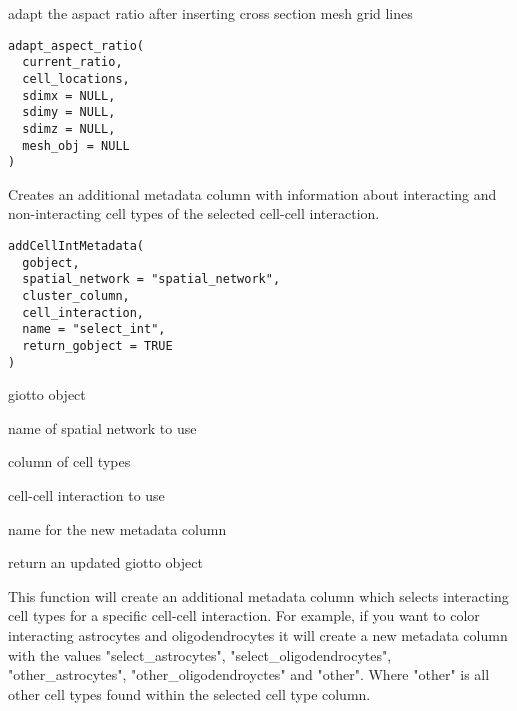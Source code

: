\documentclass[a4paper]{book}
\begin{document}
%
\begin{Description}\relax
adapt the aspact ratio after inserting cross section mesh grid lines
\end{Description}
%
\begin{Usage}
\begin{verbatim}
adapt_aspect_ratio(
  current_ratio,
  cell_locations,
  sdimx = NULL,
  sdimy = NULL,
  sdimz = NULL,
  mesh_obj = NULL
)
\end{verbatim}
\end{Usage}
%
\begin{Description}\relax
Creates an additional metadata column with information about interacting and non-interacting cell types of the
selected cell-cell interaction.
\end{Description}
%
\begin{Usage}
\begin{verbatim}
addCellIntMetadata(
  gobject,
  spatial_network = "spatial_network",
  cluster_column,
  cell_interaction,
  name = "select_int",
  return_gobject = TRUE
)
\end{verbatim}
\end{Usage}
%
\begin{Arguments}
\begin{ldescription}
\item[\code{gobject}] giotto object

\item[\code{spatial\_network}] name of spatial network to use

\item[\code{cluster\_column}] column of cell types

\item[\code{cell\_interaction}] cell-cell interaction to use

\item[\code{name}] name for the new metadata column

\item[\code{return\_gobject}] return an updated giotto object
\end{ldescription}
\end{Arguments}
%
\begin{Details}\relax
This function will create an additional metadata column which selects interacting cell types for a specific cell-cell
interaction. For example, if you want to color interacting astrocytes and oligodendrocytes it will create a new metadata column with
the values "select\_astrocytes", "select\_oligodendrocytes", "other\_astrocytes", "other\_oligodendroyctes" and "other". Where "other" is all
other cell types found within the selected cell type column.
\end{Details}
\end{document}
